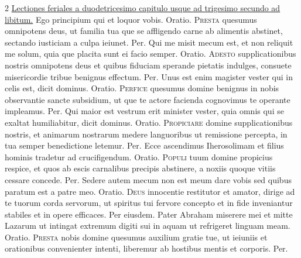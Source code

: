\begin{multicols*}{2}
\newline \ul{Lectiones feriales a duodetricesimo capitulo usque ad trigesimo secundo ad libitum.}
 Ego principium qui et loquor vobis. {\color{Red} Oratio.}
\lettrine[lines=2]{\zallmancaps \color{Red} P}{resta} quesumus omnipotens deus, ut familia tua que se affligendo carne ab alimentis abstinet, sectando iusticiam a culpa ieiunet. Per.
 Qui me misit mecum est, et non reliquit me solum, quia que placita sunt ei facio semper. {\color{Red} Oratio.}
\lettrine[lines=2]{\zallmancaps \color{Blue} A}{desto} supplicationibus nostris omnipotens deus et quibus fiduciam sperande pietatis indulges, consuete misericordie tribue benignus effectum. Per.
 Unus est enim magister vester qui in celis est, dicit dominus. {\color{Red} Oratio.}
\lettrine[lines=2]{\zallmancaps \color{Red} P}{erfice} quesumus domine benignus in nobis observantie sancte subsidium, ut que te actore facienda cognovimus te operante impleamus. Per.
 Qui maior est vestrum erit minister vester, quia omnis qui se exaltat humiliabitur, dicit dominus. {\color{Red} Oratio.}
\lettrine[lines=2]{\zallmancaps \color{Blue} P}{ropiciare} domine supplicationibus nostris, et animarum nostrarum medere languoribus ut remissione percepta, in tua semper benedictione letemur. Per.
 Ecce ascendimus Iherosolimam et filius hominis tradetur ad crucifigendum. {\color{Red} Oratio.}
\lettrine[lines=2]{\zallmancaps \color{Red} P}{opuli} tuum domine propicius respice, et quos ab escis carnalibus precipis abstinere, a noxiis quoque vitiis cessare concede. Per.
 Sedere autem mecum non est meum dare vobis sed quibus paratum est a patre meo. {\color{Red} Oratio.}
\lettrine[lines=2]{\zallmancaps \color{Blue} D}{eus} innocentie restitutor et amator, dirige ad te tuorum corda servorum, ut spiritus tui fervore concepto et in fide inveniantur stabiles et in opere efficaces. Per eiusdem.
 Pater Abraham miserere mei et mitte Lazarum ut intingat extremum digiti sui in aquam ut refrigeret linguam meam. {\color{Red} Oratio.}
\lettrine[lines=2]{\zallmancaps \color{Red} P}{resta} nobis domine quesumus auxilium gratie tue, ut ieiuniis et orationibus convenienter intenti, liberemur ab hostibus mentis et corporis. Per.

\end{multicols*}
